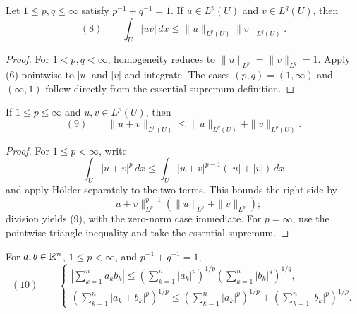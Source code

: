 \begin{lemma}
\label{lem:holders-inequality}

Let $1\leq p,q\leq\infty$ satisfy $p^{-1}+q^{-1}=1$. If $u\in L^p(U)$ and $v\in L^q(U)$, then
\[
(8)\qquad
\int_U|uv|\,dx
\leq\|u\|_{L^p(U)}\|v\|_{L^q(U)}.
\]
\end{lemma}
\begin{proof}
\sketch For $1<p,q<\infty$, homogeneity reduces to $\|u\|_{L^p}=\|v\|_{L^q}=1$. Apply (6) pointwise to $|u|$ and $|v|$ and integrate. The cases $(p,q)=(1,\infty)$ and $(\infty,1)$ follow directly from the essential-supremum definition.
\end{proof}

\begin{lemma}
\label{lem:minkowskis-inequality}

If $1\leq p\leq\infty$ and $u,v\in L^p(U)$, then
\[
(9)\qquad
\|u+v\|_{L^p(U)}
\leq\|u\|_{L^p(U)}+\|v\|_{L^p(U)}.
\]
\end{lemma}
\begin{proof}
\sketch For $1\leq p<\infty$, write
\[
\int_U|u+v|^p\,dx
\leq\int_U|u+v|^{p-1}(|u|+|v|)\,dx
\]
and apply H\"older separately to the two terms. This bounds the right side by
\[
\|u+v\|_{L^p}^{p-1}
(\|u\|_{L^p}+\|v\|_{L^p});
\]
division yields (9), with the zero-norm case immediate. For $p=\infty$, use the pointwise triangle inequality and take the essential supremum.
\end{proof}

\begin{remark}
\label{rem:discrete-holder-minkowski-inequalities}

For $a,b\in\mathbb{R}^n$, $1\leq p<\infty$, and $p^{-1}+q^{-1}=1$,
\[
(10)\qquad
\begin{cases}
\displaystyle
\left|\sum_{k=1}^na_kb_k\right|
\leq
\left(\sum_{k=1}^n|a_k|^p\right)^{1/p}
\left(\sum_{k=1}^n|b_k|^q\right)^{1/q},\\[1em]
\displaystyle
\left(\sum_{k=1}^n|a_k+b_k|^p\right)^{1/p}
\leq
\left(\sum_{k=1}^n|a_k|^p\right)^{1/p}
+\left(\sum_{k=1}^n|b_k|^p\right)^{1/p}.
\end{cases}
\]
\end{remark}

